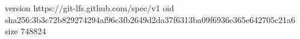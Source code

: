 version https://git-lfs.github.com/spec/v1
oid sha256:3b3c72b829274294af96c3fb2649d2da37f6313ba09f6936e365e642705c21a6
size 748824
